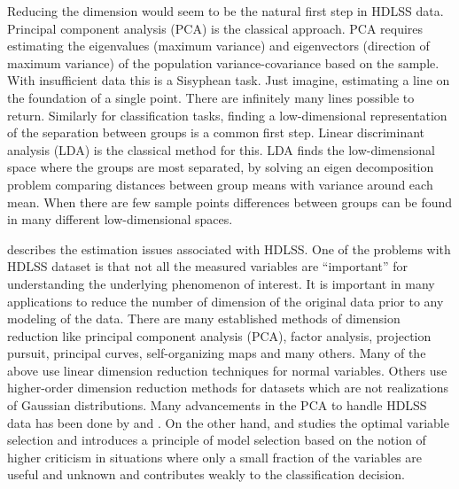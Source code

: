 \documentclass[12]{article}
\newcommand{\blue}{\color{blue}}
\begin{document}

Reducing the dimension would seem to be the natural first step in HDLSS data. Principal component analysis (PCA) is the classical approach. PCA requires estimating the eigenvalues (maximum variance) and eigenvectors (direction of maximum variance) of the population variance-covariance based on the sample. With insufficient data this is a Sisyphean task. Just imagine, estimating a line on the foundation of a single point. There are infinitely many lines possible to return. Similarly for classification tasks, finding a low-dimensional representation of the separation between groups is a common first step. Linear discriminant analysis (LDA) is the classical method for this. LDA finds the low-dimensional space where the groups are most separated, by solving an eigen decomposition problem comparing distances between group means with variance around each mean. When there are few sample points differences between groups can be found in many different low-dimensional spaces. 




\cite{marron:2007} describes the estimation issues associated with HDLSS.  
One of the problems with HDLSS dataset is that not all the measured variables are ``important'' for understanding the underlying phenomenon of interest. It is important in many applications to reduce the number of dimension of the original data prior to any modeling of the data. There are many established methods of dimension reduction like principal component analysis (PCA), factor analysis, projection pursuit, principal curves, self-organizing maps and many others. Many of the above use linear dimension reduction techniques for normal variables. Others use higher-order dimension reduction methods for datasets which are not realizations of Gaussian distributions.  Many advancements in the PCA to handle HDLSS data has been done by \cite{marron:2011} and \cite{yata:2010}. On the other hand, \cite{donoho:2009} and \cite{donoho:2008} studies the optimal variable selection and introduces a principle of model selection based on the notion of higher criticism in situations where only a small fraction of the variables are useful and unknown and contributes weakly to the classification decision.\\
\end{document}
